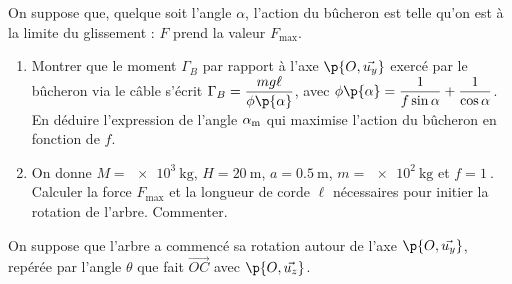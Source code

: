 \documentclass[a4paper,french,bookmarks]{article}
\begin{document}
    On suppose que, quelque soit l'angle $\alpha$, l'action du bûcheron est telle qu'on est à la limite du glissement : $F$ prend la valeur $F_\text{max}$.
    
    \begin{enumerate}[resume]
        \item Montrer que le moment $\Gamma_B$ par rapport à l'axe $\p{O, \vec{u_y}}$ exercé par le bûcheron via le câble s'écrit $\Gamma_B = \dfrac{mg\ell}{\phi\p{\alpha}}$, avec $\phi\p{\alpha} = \dfrac{1}{f\sin \alpha} + \dfrac{1}{\cos \alpha}$. En déduire l'expression de l'angle $\alpha_\text m$ qui maximise l'action du bûcheron en fonction de $f$.
        
        \noafter
        \nobefore\yesafter
        \yesbefore
        
        \item On donne $M = \qty{e3}{\kg}$, $H = \qty{20}{\m}$, $a = \qty{0.5}{\m}$, $m = \qty{e2}{\kg}$ et $f = \qty{1}{}$. Calculer la force $F_\text{max}$ et la longueur de corde $\ell$ nécessaires pour initier la rotation de l'arbre. Commenter.
        
    \end{enumerate}
    
    On suppose que l'arbre a commencé sa rotation autour de l'axe $\p{O, \vec{u_y}}$, repérée par l'angle $\theta$ que fait $\vec{OC}$ avec $\p{O, \vec{u_z}}$.
    
\end{document}
